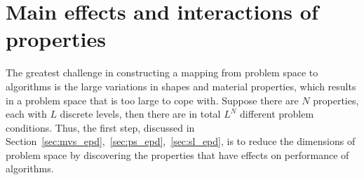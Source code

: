 

  

\section{Main effects and interactions of properties}
\label{sec:prop_effect_interaction}
The greatest challenge in constructing a mapping from problem space to algorithms is the large variations in shapes and material properties, which results in a problem space that is too large to cope with. Suppose there are $N$ properties, each with $L$ discrete levels, then there are in total $L^N$ different problem conditions. Thus, the first step, discussed in Section~\ref{sec:mvs_epd},~\ref{sec:ps_epd},~\ref{sec:sl_epd}, is to reduce the dimensions of problem space by discovering the properties that have effects on performance of algorithms.

